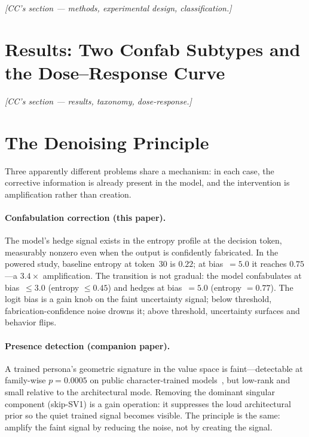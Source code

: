 \documentclass[11pt,a4paper]{article}
\begin{document}
\emph{[CC's section --- methods, experimental design, classification.]}

\section{Results: Two Confab Subtypes and the Dose--Response Curve}
\label{sec:results}


\emph{[CC's section --- results, taxonomy, dose-response.]}

\section{The Denoising Principle}
\label{sec:denoising}

Three apparently different problems share a mechanism: in each case, the
corrective information is already present in the model, and the intervention
is amplification rather than creation.

\paragraph{Confabulation correction (this paper).}
The model's hedge signal exists in the entropy profile at the decision token,
measurably nonzero even when the output is confidently fabricated. In the
powered study, baseline entropy at token~30 is $0.22$; at bias~$= 5.0$ it
reaches $0.75$---a $3.4\times$ amplification. The transition is not gradual:
the model confabulates at bias~$\leq 3.0$ (entropy $\leq 0.45$) and hedges at
bias~$= 5.0$ (entropy $= 0.77$). The logit bias is a gain knob on the faint
uncertainty signal; below threshold, fabrication-confidence noise drowns it;
above threshold, uncertainty surfaces and behavior flips.

\paragraph{Presence detection (companion paper).}
A trained persona's geometric signature in the value space is faint---detectable
at family-wise $p = 0.0005$ on public character-trained
models~\citep{maiya2025oct}, but low-rank and small relative to the
architectural mode. Removing the dominant singular component (skip-SV1) is a
gain operation: it suppresses the loud architectural prior so the quiet trained
signal becomes visible. The principle is the same: amplify the faint signal by
reducing the noise, not by creating the signal.
\end{document}
